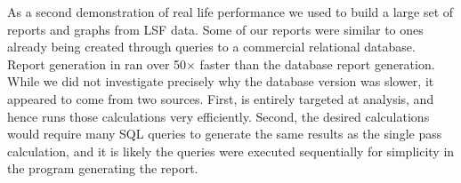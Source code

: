 As a second demonstration of real life performance we used
\DataSeries{} to build a large set of reports and graphs from LSF
data.  Some of our reports were similar to ones already being created
through queries to a commercial relational database.  Report
generation in \DataSeries{} ran over 50$\times$ faster than the
database report generation.  While we did not investigate precisely
why the database version was slower, it appeared to come from two
sources.  First, \DataSeries{} is entirely targeted at analysis, and
hence runs those calculations very efficiently.  Second, the desired
calculations would require many SQL queries to generate the same
results as the single pass \DataSeries{} calculation, and it is likely
the queries were executed sequentially for simplicity in the program
generating the report.

